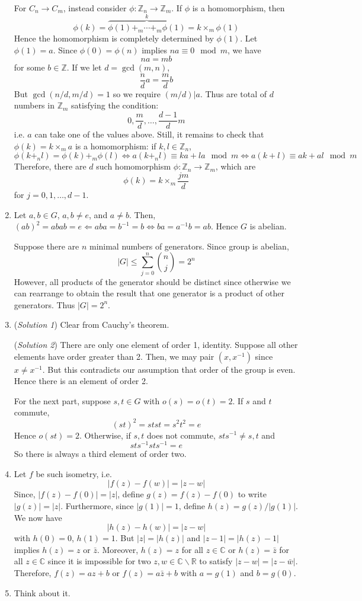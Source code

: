 \documentclass[10pt, a4paper, twoside]{report}
\begin{document}
\begin{enumerate}[{1.}]
    For \(C_n\to C_m\), instead consider \(\phi:\mathbb{Z}_n\to\mathbb{Z}_m\). If \(\phi\) is a homomorphism, then 
    \[\phi(k)=\overbrace{\phi(1)+_m\cdots +_m\phi(1)}^{k}=k\times_m\phi(1)\]
    Hence the homomorphism is completely determined by \(\phi(1)\). Let \(\phi(1)=a\). Since \(\phi(0)=\phi(n)\) implies \(na\equiv 0\mod m\), we have 
    \[na=mb\] for some \(b\in\mathbb{Z}\). If we let \(d=\gcd(m,n)\), 
    \[\frac nda=\frac mdb\]
    But \(\gcd(n/d,m/d)=1\) so we require \((m/d)|a\). Thus are total of \(d\) numbers in \(\mathbb{Z}_m\) satisfying the condition:
    \[0,\frac md,\ldots,\frac{d-1}{d}m\]
    i.e. \(a\) can take one of the values above. Still, it remains to check that \(\phi(k)=k\times_m a\) is a homomorphism: if \(k,l\in\mathbb{Z}_n\),
    \[\phi(k+_nl)=\phi(k)+_m\phi(l)\Leftrightarrow a(k+_n l)\equiv ka+la\mod m\Leftrightarrow a(k+l)\equiv ak+al\mod m\]
    Therefore, there are \(d\) such homomorphism \(\phi:\mathbb{Z}_n\to\mathbb{Z}_m\), which are 
    \[\phi(k)=k\times_m\frac{jm}{d}\]
    for \(j=0,1,\ldots,d-1\).
    \item Let \(a,b\in G\), \(a,b\neq e\), and \(a\neq b\). Then, \((ab)^2=abab=e\Leftarrow aba=b^{-1}=b \Leftrightarrow ba=a^{-1}b=ab\). Hence \(G\) is abelian.
    
    Suppose there are \(n\) minimal numbers of generators. Since group is abelian,
    \[|G|\leq \sum_{j=0}^{n}\binom nj=2^n\]
    However, all products of the generator should be distinct since otherwise we can rearrange to obtain the result that one generator is a product of other generators. Thus \(|G|=2^n\).
    \item (\emph{Solution 1}) Clear from Cauchy's theorem.
    
    (\emph{Solution 2}) There are only one element of order 1, identity. Suppose all other elements have order greater than 2. Then, we may pair \((x,x^{-1})\) since \(x\neq x^{-1}\). But this contradicts our assumption that order of the group is even. Hence there is an element of order 2.

    For the next part, suppose \(s,t\in G\) with \(o(s)=o(t)=2\). If \(s\) and \(t\) commute,
    \[(st)^2=stst=s^2t^2=e\]
    Hence \(o(st)=2\). Otherwise, if \(s,t\) does not commute, \(sts^{-1}\neq s,t\) and 
    \[sts^{-1}sts^{-1}=e\]
    So there is always a third element of order two.
    \item Let \(f\) be such isometry, i.e. 
    \[|f(z)-f(w)|=|z-w|\]
    Since, \(|f(z)-f(0)|=|z|\), define \(g(z)=f(z)-f(0)\) to write \(|g(z)|=|z|\). Furthermore, since \(|g(1)|=1\), define \(h(z)=g(z)/|g(1)|\). We now have 
    \[|h(z)-h(w)|=|z-w|\]
    with \(h(0)=0\), \(h(1)=1\). But \(|z|=|h(z)|\) and \(|z-1|=|h(z)-1|\) implies \(h(z)=z\text{  or  }\bar{z}\). Moreover, \(h(z)=z\) for all \(z\in\mathbb{C}\) or \(h(z)=\bar{z}\) for all \(z\in\mathbb{C}\) since it is impossible for two \(z,w\in\mathbb{C}\backslash\mathbb{R}\) to satisfy \(|z-w|=|z-\bar{w}|\). Therefore, \(f(z)=az+b\) or \(f(z)=a\bar{z}+b\) with \(a=g(1)\) and \(b=g(0)\).
    \item Think about it.
\end{enumerate}
\end{document}
